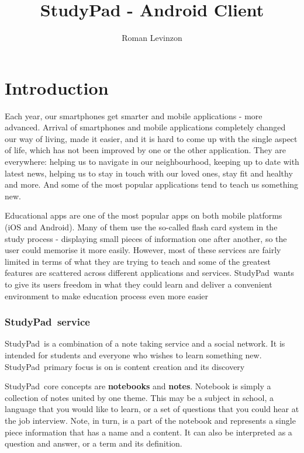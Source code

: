\documentclass[thesis=B,english]{FITthesis}[2012/10/20]
\title{StudyPad - Android Client}
\author{Roman Levinzon} %
\newcommand{\appname}{StudyPad}
\begin{document}

\chapter{Introduction}

Each year, our smartphones get smarter and mobile applications - more advanced. Arrival of smartphones and mobile applications completely changed our way of living, made it easier, and it is hard to come up with the single aspect of life, which has not been improved by one or the other application. They are everywhere: helping us to navigate in our neighbourhood, keeping up to date with latest news, helping us to stay in touch with our loved ones, stay  fit and healthy and more. And some of the most popular applications tend to teach us something new.	

Educational apps are one of the most popular apps on both mobile platforms (iOS and Android). Many of them use the so-called flash card system in the study process - displaying small pieces of information one after another, so the user could memorise it more easily. However, most of these services are fairly limited in terms of what they are trying to teach and some of the greatest  features are scattered across different applications and services. \appname\ wants to give its users freedom in what they could learn and deliver a convenient environment to make education process even more easier

\subsection{\appname\ service}
\appname\ is a combination of a note taking service and a social network. It is intended for students and everyone who wishes to learn something new. \appname\ primary focus is on is content creation and its discovery

\appname\ core concepts are \textbf{notebooks} and \textbf{notes}. Notebook is simply a collection of notes united by one theme. This may be a subject in school, a language that you would like to learn, or a set of questions that you could hear at the job interview. Note, in turn, is a part of the notebook and represents a single piece information that has a name and a content. It can also be interpreted as a question and answer, or a term and its definition.
\end{document}
